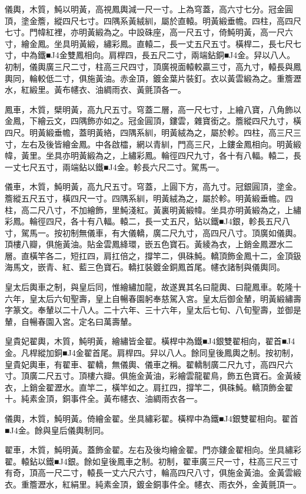 \begin{pinyinscope}
儀輿，木質，魨以明黃，高視鳳輿減一尺一寸。上為穹蓋，高六寸七分。冠金圓頂，塗金簷，縱四尺七寸。四隅系黃絨紃，屬於直轅。明黃緞垂幨。四柱，高四尺七寸。門幃紅裡，亦明黃緞為之。中設硃座，高一尺五寸，倚魨明黃，高一尺六寸，繪金鳳。坐具明黃緞，繡彩鳳。直轅二，長一丈五尺五寸。橫桿二，長七尺七寸，中為鐵■J4金雙鳳相向。肩桿四，長五尺二寸，兩端鉆銅■J4金。舁以八人。初制，儀輿廣三尺二寸，柱高三尺四寸，頂廣視面轅較贏三寸，高九寸，轅長與鳳輿同，輪較低二寸，俱施黃油。赤金頂，鍍金葉片裝釘。衣以黃雲緞為之。重簷瀝水，紅緞里。黃布幰衣、油綢雨衣、黃氈頂各一。

鳳車，木質，檗明黃，高九尺五寸。穹蓋二層，高一尺七寸，上繪八寶，八角飾以金鳳，下繪云文，四隅飾亦如之。冠金圓頂，鏤雲，雜寶銜之。簷縱四尺九寸，橫四尺。明黃緞垂幨，蓋明黃絡，四隅系紃，明黃絨為之，屬於軫。四柱，高三尺三寸，左右及後皆繪金鳳。中各啟櫺，網以青紃，門高三尺，上鏤金鳳相向。明黃緞幃，黃里。坐具亦明黃緞為之，上繡彩鳳。輪徑四尺九寸，各十有八輻。轅二，長一丈七尺五寸，兩端鉆以鐵■J4金。軫長六尺二寸。駕馬一。

儀車，木質，魨明黃，高九尺五寸。穹蓋，上圓下方，高九寸。冠銀圓頂，塗金。簷縱五尺五寸，橫四尺一寸。四隅系紃，明黃絨為之，屬於軫。明黃緞垂幨。四柱，高二尺八寸，不加繪飾，里魨淺紅。黃裏明黃緞幃。坐具亦明黃緞為之，上繡彩鳳。輪徑四尺，各十有八輻。轅二，長一丈五尺，鉆以鐵■J4銀，軫長五尺八寸，駕馬一。按初制無儀車，有大儀轎，廣二尺九寸，高四尺八寸。頂廣如儀輿。頂樓八瓣，俱施黃油。貼金雲鳳絳環，嵌五色寶石。黃綾為衣，上銷金鳳瀝水二層。直橫竿各二，短扛四，肩扛倍之，撐竿二，俱硃魨。轎頂飾金鳳十二，金頂鈒海馬文，嵌青、紅、藍三色寶石。轎扛裝鍍金銅鳳首尾。幰衣諸制與儀輿同。

皇太后輿車之制，與皇后同，惟繪繡加龍，故遂異其名曰龍輿、曰龍鳳車。乾隆十六年，皇太后六旬聖壽，皇上自暢春園躬奉慈駕入宮。皇太后御金輦，明黃緞繡壽字篆文。奉輦以二十八人。二十六年、三十六年，皇太后七旬、八旬聖壽，並御是輦，自暢春園入宮。定名曰萬壽輦。

皇貴妃翟輿，木質，魨明黃，繪繡皆金翟。橫桿中為鐵■J4銀雙翟相向，翟首■J4金。凡桿縱加銅■J4金翟首尾。肩桿四。舁以八人。餘同皇後鳳輿之制。按初制，皇貴妃輿車，有翟車、翟轎，無儀輿、儀車之稱。翟轎制廣二尺九寸，高四尺六寸。頂廣二尺五寸。頂樓六瓣。俱施金黃油，彩繪雲龍翟鳥，飾五色寶石。金黃綾衣，上銷金翟瀝水。直竿二，橫竿如之。肩扛四，撐竿二，俱硃魨。轎頂飾金翟十。純素金頂，銅事件全。黃布幰衣、油綢雨衣各一。

儀輿，木質，魨明黃。倚繪金翟。坐具繡彩翟。橫桿中為鐵■J4銀雙翟相向。翟首■J4金。餘與皇后儀輿制同。

翟車，木質，魨明黃。蓋飾金翟。左右及後均繪金翟。門亦鏤金翟相向。坐具繡彩翟。轅鉆以鐵■J4銀。餘如皇後鳳車之制。初制，翟車廣三尺一寸，柱高三尺三寸有奇，頂高一尺二寸，轅長一丈六尺六寸，輪高四尺八寸，俱施金黃油。金黃雲緞衣。重簷瀝水，紅絹里。純素金頂，鍍金銅事件全。幰衣、雨衣外，金黃氈頂一。


\end{pinyinscope}
